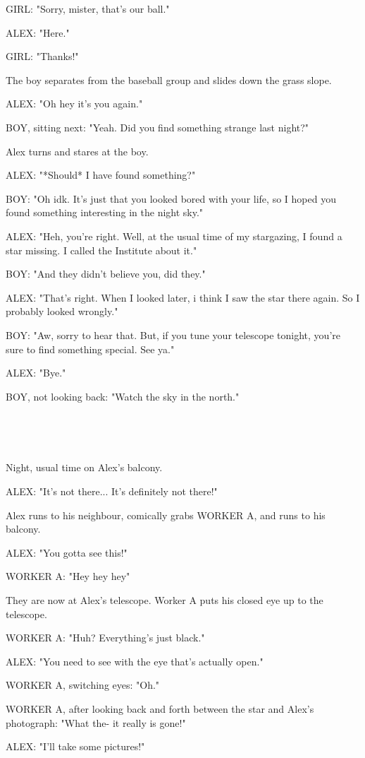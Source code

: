 \documentclass[11pt]{article}
\begin{document}
GIRL: "Sorry, mister, that's our ball."

ALEX: "Here."

GIRL: "Thanks!"

The boy separates from the baseball group and slides down the grass slope.

ALEX: "Oh hey it's you again."

BOY, sitting next: "Yeah. Did you find something strange last night?"

Alex turns and stares at the boy.

ALEX: "*Should* I have found something?"

BOY: "Oh idk. It's just that you looked bored with your life, so I hoped you found something interesting in the night sky."

ALEX: "Heh, you're right.
Well, at the usual time of my stargazing, I found a star missing. 
I called the Institute about it."

BOY: "And they didn't believe you, did they."

ALEX: "That's right.
When I looked later, i think I saw the star there again.
So I probably looked wrongly."

BOY: "Aw, sorry to hear that.
But, if you tune your telescope tonight, you're sure to find something special. 
See ya."

ALEX: "Bye."

BOY, not looking back: "Watch the sky in the north."

\ 

\ 

Night, usual time on Alex's balcony.

ALEX: "It's not there... It's definitely not there!"

Alex runs to his neighbour, comically grabs WORKER A, and runs to his balcony.

ALEX: "You gotta see this!"

WORKER A: "Hey hey hey"

They are now at Alex's telescope.
Worker A puts his closed eye up to the telescope.

WORKER A: "Huh? Everything's just black."

ALEX: "You need to see with the eye that's actually open."

WORKER A, switching eyes: "Oh."

WORKER A, after looking back and forth between the star and Alex's photograph: "What the- it really is gone!"

ALEX: "I'll take some pictures!"
\end{document}

